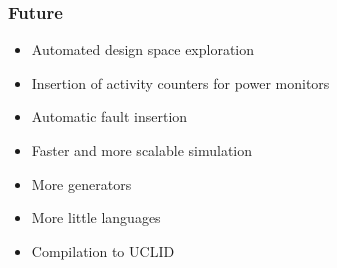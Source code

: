 \documentclass[xcolor=pdflatex,dvipsnames,table]{beamer}
\begin{document}
\begin{frame}[fragile]
\frametitle{Future}

\begin{itemize}
\item Automated design space exploration
\item Insertion of activity counters for power monitors
\item Automatic fault insertion
\item Faster and more scalable simulation
\item More generators
\item More little languages
\item Compilation to UCLID
\end{itemize}

\end{frame}
\end{document}
